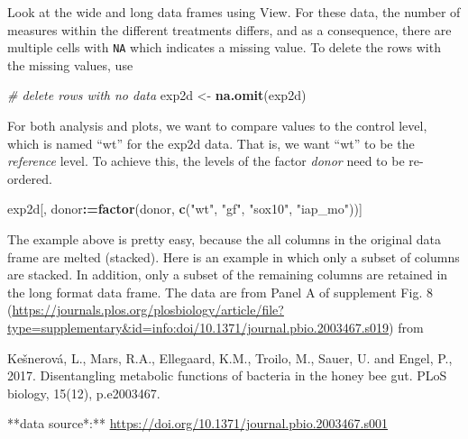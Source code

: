\documentclass[]{book}
\newenvironment{Shaded}{\begin{snugshade}}{\end{snugshade}}
\newcommand{\KeywordTok}[1]{\textcolor[rgb]{0.13,0.29,0.53}{\textbf{#1}}}
\newcommand{\StringTok}[1]{\textcolor[rgb]{0.31,0.60,0.02}{#1}}
\newcommand{\CommentTok}[1]{\textcolor[rgb]{0.56,0.35,0.01}{\textit{#1}}}
\newcommand{\OperatorTok}[1]{\textcolor[rgb]{0.81,0.36,0.00}{\textbf{#1}}}
\newcommand{\ErrorTok}[1]{\textcolor[rgb]{0.64,0.00,0.00}{\textbf{#1}}}
\newcommand{\NormalTok}[1]{#1}
\begin{document}
Look at the wide and long data frames using View. For these data, the
number of measures within the different treatments differs, and as a
consequence, there are multiple cells with \texttt{NA} which indicates a
missing value. To delete the rows with the missing values, use

\begin{Shaded}
\begin{Highlighting}[]
\CommentTok{# delete rows with no data}
\NormalTok{exp2d <-}\StringTok{ }\KeywordTok{na.omit}\NormalTok{(exp2d)}
\end{Highlighting}
\end{Shaded}

For both analysis and plots, we want to compare values to the control
level, which is named ``wt'' for the exp2d data. That is, we want ``wt''
to be the \emph{reference} level. To achieve this, the levels of the
factor \emph{donor} need to be re-ordered.

\begin{Shaded}
\begin{Highlighting}[]
\NormalTok{exp2d[, donor}\OperatorTok{:}\ErrorTok{=}\KeywordTok{factor}\NormalTok{(donor, }\KeywordTok{c}\NormalTok{(}\StringTok{"wt"}\NormalTok{, }\StringTok{"gf"}\NormalTok{, }\StringTok{"sox10"}\NormalTok{, }\StringTok{"iap_mo"}\NormalTok{))]}
\end{Highlighting}
\end{Shaded}

The example above is pretty easy, because the all columns in the
original data frame are melted (stacked). Here is an example in which
only a subset of columns are stacked. In addition, only a subset of the
remaining columns are retained in the long format data frame. The data
are from Panel A of supplement Fig. 8
(\url{https://journals.plos.org/plosbiology/article/file?type=supplementary\&id=info:doi/10.1371/journal.pbio.2003467.s019})
from

Kešnerová, L., Mars, R.A., Ellegaard, K.M., Troilo, M., Sauer, U. and
Engel, P., 2017. Disentangling metabolic functions of bacteria in the
honey bee gut. PLoS biology, 15(12), p.e2003467.

**data source*:**
\url{https://doi.org/10.1371/journal.pbio.2003467.s001}
\end{document}
